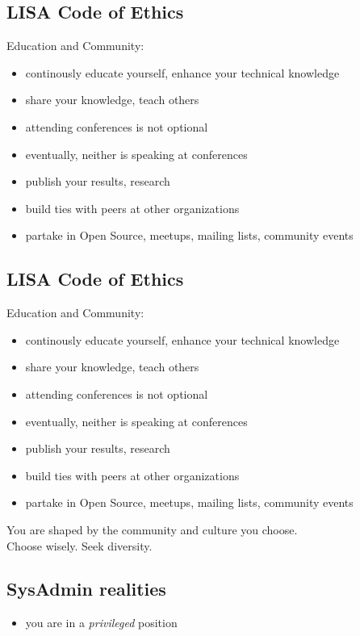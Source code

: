 \documentclass[xga]{xdvislides}
\begin{document}
\subsection{LISA Code of Ethics}
Education and Community:
\begin{itemize}
	\item continously educate yourself, enhance your technical knowledge
	\item share your knowledge, teach others
	\item attending conferences is not optional
	\item eventually, neither is speaking at conferences
	\item publish your results, research
	\item build ties with peers at other organizations
	\item partake in Open Source, meetups, mailing lists, community events
\end{itemize}

\subsection{LISA Code of Ethics}
Education and Community:
\begin{itemize}
	\item continously educate yourself, enhance your technical knowledge
	\item share your knowledge, teach others
	\item attending conferences is not optional
	\item eventually, neither is speaking at conferences
	\item publish your results, research
	\item build ties with peers at other organizations
	\item partake in Open Source, meetups, mailing lists, community events
\end{itemize}
\vspace{.5in}
You are shaped by the community and culture you choose. \\
Choose wisely.  Seek diversity.

\subsection{SysAdmin realities}
\begin{itemize}
	\item you are in a {\em privileged} position
\end{itemize}
\end{document}

